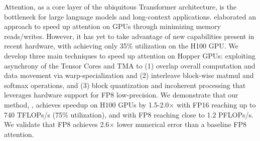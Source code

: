Attention, as a core layer of the ubiquitous Transformer architecture, is the bottleneck for large language models and long-context applications.
\fa elaborated an approach to speed up attention on GPUs through minimizing memory reads/writes.
However, it has yet to take advantage of new capabilities present in recent
hardware, with \faa achieving only 35\% utilization on the H100 GPU.
We develop three main techniques to speed up attention on Hopper GPUs: exploiting
asynchrony of the Tensor Cores and TMA to (1) overlap overall computation and data movement via warp-specialization and (2) interleave block-wise matmul and softmax operations, and (3)
block quantization and incoherent processing that leverages hardware support for FP8 low-precision.
We demonstrate that our method, \fat, achieves speedup on H100 GPUs
by 1.5-2.0$\times$ with FP16 reaching up to 740 TFLOPs/s (75\% utilization), and with FP8 reaching close to 1.2
PFLOPs/s.
We validate that FP8 \fat achieves 2.6$\times$ lower numerical error than a baseline
FP8 attention.

